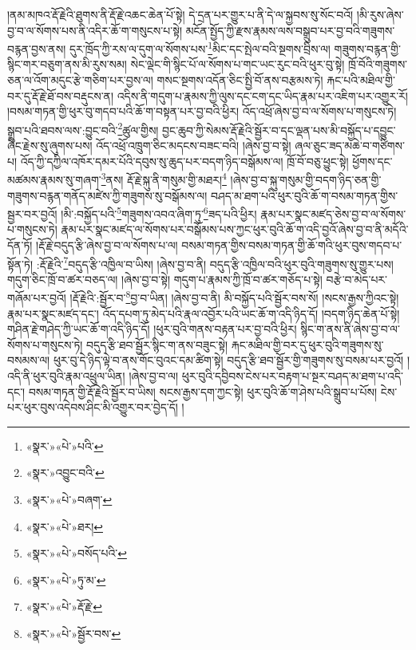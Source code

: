 །ནམ་མཁའ་རྡོ་རྗེའི་ཐུགས་ནི་རྡོ་རྗེ་འཆང་ཆེན་པོ་སྟེ། དེ་དྲན་པར་གྱུར་པ་ནི་དེ་ལ་སྐྱབས་སུ་སོང་བའོ། །མི་རུས་ཞེས་བྱ་བ་ལ་སོགས་པས་ནི་འདིར་ཆོ་ག་གསུངས་པ་སྟེ། མངོན་སྤྱོད་ཀྱི་རྫས་རྣམས་ལས་བསྒྲུབ་པར་བྱ་བའི་གཟུགས་བརྙན་བྱས་ནས། དུར་ཁྲོད་ཀྱི་རས་ལ་དུག་ལ་སོགས་པས་\footnote{«སྣར་»«པེ་»པའི་}མིང་དང་སྤེལ་བའི་སྔགས་བྲིས་ལ། གཟུགས་བརྙན་གྱི་སྙིང་གར་བཅུག་ནས་མི་རུས་སམ། སེང་ལྡེང་གི་སྙིང་པོ་ལ་སོགས་པ་གང་ཡང་རུང་བའི་ཕུར་བུ་སྟེ། ཁྲོ་བོའི་གཟུགས་ཅན་ལ་འོག་མདུང་རྩེ་གཅིག་པར་བྱས་ལ། གསང་སྔགས་འདོན་ཅིང་སྤྱི་བོ་ནས་བརྩམས་ཏེ། རྐང་པའི་མཐིལ་གྱི་བར་དུ་རྡོ་རྗེ་ཐོ་བས་བརྡུངས་ན། འདིས་ནི་གདུག་པ་རྣམས་ཀྱི་ལུས་དང་ངག་དང་ཡིད་རྣམ་པར་འཇིག་པར་འགྱུར་རོ། །བསམ་གཏན་གྱི་ཕུར་བུ་གདབ་པའི་ཆོ་ག་བསྟན་པར་བྱ་བའི་ཕྱིར། འོད་འཕྲོ་ཞེས་བྱ་བ་ལ་སོགས་པ་གསུངས་ཏེ། སྒྲུབ་པའི་ཐབས་ལས་:བྱུང་བའི་\footnote{«སྣར་»འབྱུང་བའི་}ཚུལ་གྱིས། བྱང་ཆུབ་ཀྱི་སེམས་རྡོ་རྗེའི་སྦྱོར་བ་དང་ལྡན་པས་མི་བསྐྱོད་པ་དབྱུང་ཞིང་རྗེས་སུ་ཞུགས་པས། འོད་འཕྲོ་འཁྲུག་ཅིང་མདངས་བཟང་བའི། །ཞེས་བྱ་བ་སྟེ། ཞལ་ཅུང་ཟད་མཆེ་བ་གཙིགས་པ། འོད་ཀྱི་དཀྱིལ་འཁོར་དམར་པོའི་དབུས་སུ་ཆུད་པར་བདག་ཉིད་བསྒོམས་ལ། ཁྲོ་བོ་བཅུ་ཕྱུང་སྟེ། ཕྱོགས་དང་མཚམས་རྣམས་སུ་གཞག་\footnote{«སྣར་»«པེ་»བཞག་}ནས། རྡོ་རྗེ་སྐུ་ནི་གསུམ་གྱི་མཐར།\footnote{«སྣར་»«པེ་»ཐར།} །ཞེས་བྱ་བ་སྐུ་གསུམ་གྱི་བདག་ཉིད་ཅན་གྱི་གཟུགས་བརྙན་གནོད་མཛེས་ཀྱི་གཟུགས་སུ་བསྒོམས་ལ། བཤད་མ་ཐག་པའི་ཕུར་བུའི་ཆོ་ག་བསམ་གཏན་གྱིས་སྦྱར་བར་བྱའོ། །མི་:བསྐྱོད་པའི་\footnote{«སྣར་»«པེ་»བསོད་པའི་}གཟུགས་འབའ་ཞིག་ཏུ་\footnote{«སྣར་»«པེ་»ཏུ་མ་}ཟད་པའི་ཕྱིར། རྣམ་པར་སྣང་མཛད་ཅེས་བྱ་བ་ལ་སོགས་པ་གསུངས་ཏེ། རྣམ་པར་སྣང་མཛད་ལ་སོགས་པར་བསྒོམས་པས་ཀྱང་ཕུར་བུའི་ཆོ་ག་འདི་བྱའོ་ཞེས་བྱ་བ་ནི་མདོའི་དོན་ཏོ། །རྡོ་རྗེ་བདུད་རྩི་ཞེས་བྱ་བ་ལ་སོགས་པ་ལ། བསམ་གཏན་གྱིས་བསམ་གཏན་གྱི་ཆོ་གའི་ཕུར་བུས་གདབ་པ་སྟོན་ཏེ། :རྡོ་རྗེའི་\footnote{«སྣར་»«པེ་»རྡོ་རྗེ་}བདུད་རྩི་འཁྱིལ་བ་ཡིས། །ཞེས་བྱ་བ་ནི། བདུད་རྩི་འཁྱིལ་བའི་ཕུར་བུའི་གཟུགས་སུ་གྱུར་པས། གདུག་ཅིང་ཁྲོ་བ་ཚར་བཅད་ལ། །ཞེས་བྱ་བ་སྟེ། གདུག་པ་རྣམས་ཀྱི་ཁྲོ་བ་ཚར་གཅོད་པ་སྟེ། བརྩེ་བ་མེད་པར་གཞོམ་པར་བྱའོ། །རྡོ་རྗེའི་:སྦྱོར་བ་\footnote{«སྣར་»«པེ་»སྦྱོར་བས་}བྱ་བ་ཡིན། །ཞེས་བྱ་བ་ནི། མི་བསྐྱོད་པའི་སྦྱོར་བས་སོ། །སངས་རྒྱས་ཀྱིའང་སྟེ། རྣམ་པར་སྣང་མཛད་དང་། འོད་དཔག་ཏུ་མེད་པའི་རྣལ་འབྱོར་པའི་ཡང་ཆོ་ག་འདི་ཉིད་དོ། །བདག་ཉིད་ཆེན་པོ་སྟེ། གཤིན་རྗེ་གཤེད་ཀྱི་ཡང་ཆོ་ག་འདི་ཉིད་དོ། །ཕུར་བུའི་གནས་བརྟན་པར་བྱ་བའི་ཕྱིར། སྙིང་ག་ནས་ནི་ཞེས་བྱ་བ་ལ་སོགས་པ་གསུངས་ཏེ། བདུད་རྩི་ཐབ་སྦྱོར་སྙིང་ག་ནས་བཟུང་སྟེ། རྐང་མཐིལ་གྱི་བར་དུ་ཕུར་བུའི་གཟུགས་སུ་བསམས་ལ། ཕུར་བུ་དེ་ཉིད་ལྟེ་བ་ནས་གོང་བུའང་དམ་ཚིག་སྟེ། བདུད་རྩི་ཐབ་སྦྱོར་གྱི་གཟུགས་སུ་བསམ་པར་བྱའོ། །འདི་ནི་ཕུར་བུའི་རྣམ་འཕྲུལ་ཡིན། །ཞེས་བྱ་བ་ལ། ཕུར་བུའི་དབྱིབས་ངེས་པར་བརྟག་པ་སྔར་བཤད་མ་ཐག་པ་འདི་དང་། བསམ་གཏན་གྱི་རྡོ་རྗེའི་སྦྱོར་བ་ཡིས། སངས་རྒྱས་དག་ཀྱང་སྟེ། ཕུར་བུའི་ཆོ་ག་ཤེས་པའི་སྒྲུབ་པ་པོས། ངེས་པར་ཕུར་བུས་འདེབས་ཤིང་མི་འགྱུར་བར་བྱེད་དོ། །
